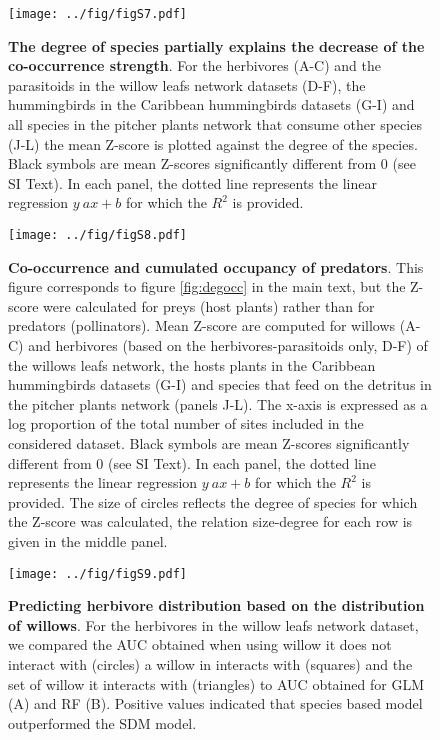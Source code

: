 \newpage

\begin{figure}
\centering
\texttt{[image: ../fig/figS7.pdf]}
\caption{\textbf{The degree of species partially explains the decrease
of the co-occurrence strength}. For the herbivores (A-C) and the
parasitoids in the willow leafs network datasets (D-F), the hummingbirds
in the Caribbean hummingbirds datasets (G-I) and all species in the
pitcher plants network that consume other species (J-L) the mean Z-score
is plotted against the degree of the species. Black symbols are mean
Z-scores significantly different from 0 (see SI Text). In each panel,
the dotted line represents the linear regression \(y~ax+b\) for which
the \(R^2\) is provided.\label{fig:degree}}
\end{figure}

\newpage

\begin{figure}
\centering
\texttt{[image: ../fig/figS8.pdf]}
\caption{\textbf{Co-occurrence and cumulated occupancy of predators}.
This figure corresponds to figure \ref{fig:degocc} in the main text, but
the Z-score were calculated for preys (host plants) rather than for
predators (pollinators). Mean Z-score are computed for willows (A-C) and
herbivores (based on the herbivores-parasitoids only, D-F) of the
willows leafs network, the hosts plants in the Caribbean hummingbirds
datasets (G-I) and species that feed on the detritus in the pitcher
plants network (panels J-L). The x-axis is expressed as a log proportion
of the total number of sites included in the considered dataset. Black
symbols are mean Z-scores significantly different from 0 (see SI Text).
In each panel, the dotted line represents the linear regression
\(y~ax+b\) for which the \(R^2\) is provided. The size of circles
reflects the degree of species for which the Z-score was calculated, the
relation size-degree for each row is given in the middle
panel.\label{fig:degocc2}}
\end{figure}

\newpage

\begin{figure}
\centering
\texttt{[image: ../fig/figS9.pdf]}
\caption{\textbf{Predicting herbivore distribution based on the
distribution of willows}. For the herbivores in the willow leafs network
dataset, we compared the AUC obtained when using willow it does not
interact with (circles) a willow in interacts with (squares) and the set
of willow it interacts with (triangles) to AUC obtained for GLM (A) and
RF (B). Positive values indicated that species based model outperformed
the SDM model.\label{fig:ratauc}}
\end{figure}
